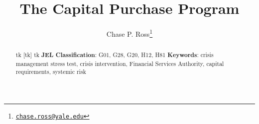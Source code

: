 \documentclass[12pt]{article}
\begin{document}
\lhead{}
\rhead{}

\renewcommand{\headrulewidth}{0.0pt}
\renewcommand{\footrulewidth}{0.0pt}

\title{The Capital Purchase Program}
\author{Chase P. Ross\thanks{\texttt{\href{mailto:chase.ross@yale.edu}{chase.ross@yale.edu}}}}


\maketitle

\begin{abstract}
tk
[tk]
tk
\newline
\newline
\textbf{JEL Classification}: G01, G28, G20, H12, H81
\newline
\textbf{Keywords}: crisis management stress test, crisis intervention, Financial Services Authority, capital requirements, systemic risk

\end{abstract}
\newpage
\tableofcontents
\newpage

\label{sec:body}


\label{sec:design}


\label{sec:evaluation}


\newpage
{}
{}
\nocite{*}

\newpage

%

\label{sec:roadmap}

\end{document}
